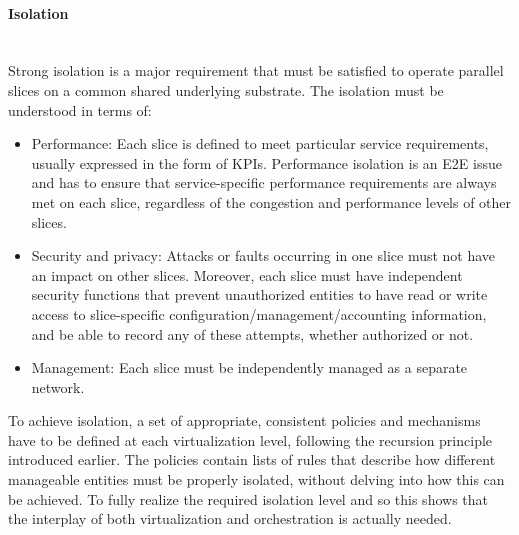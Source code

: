 \documentclass[a4paper,12pt]{report} %
\begin{document}
\paragraph{Isolation}\mbox{}\\
Strong isolation is a major requirement that must
be satisfied to operate parallel slices on a common shared underlying substrate. The isolation
must be understood in terms of:
\begin{itemize}
\item Performance: Each slice is defined to meet particular service requirements, usually expressed in the
form of \gls{KPI}s. Performance isolation is an E2E issue and has to ensure
that service-specific performance requirements are
always met on each slice, regardless of the congestion and performance levels of other slices.
\end{itemize}
\begin{itemize}
\item Security and privacy: Attacks or faults occurring in one slice must not have an impact on
other slices. Moreover, each slice must have
independent security functions that prevent unauthorized entities to have read or write access to
slice-specific configuration/management/accounting information, and be able to record any of
these attempts, whether authorized or not.
\end{itemize}
\begin{itemize}
\item Management: Each slice must be independently managed as a separate network.
\end{itemize}
To achieve isolation, a set of appropriate, consistent policies and mechanisms have to be defined
at each virtualization level, following the recursion
principle introduced earlier. The policies contain lists of rules that describe how different manageable entities must be properly isolated, without delving into how this can be achieved.
To fully realize the
required isolation level and so this shows that the interplay of both virtualization and orchestration is actually needed.
\end{document}

